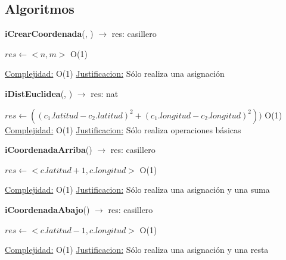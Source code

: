 \subsection{Algoritmos}
\begin{Algoritmos}

\begin{algorithm}[H]{\textbf{iCrearCoordenada}(, ) $\to$ res: casillero}
	\begin{algorithmic}[1]
		\State $res \gets <n, m>$ \Comment O(1)
		
		\medskip
		\Statex \underline{Complejidad:} O(1)
			\Statex \underline{Justificacion:} Sólo realiza una asignación
	\end{algorithmic}
\end{algorithm}

\begin{algorithm}[H]{\textbf{iDistEuclidea}(, ) $\to$ res: nat}
	\begin{algorithmic}[1]
		\State $res \gets ((c_1.latitud - c_2.latitud)^{2} + (c_1.longitud  - c_2.longitud)^{2}))$ \Comment O(1)
				\medskip
		\Statex \underline{Complejidad:} O(1)
			\Statex \underline{Justificacion:} Sólo realiza operaciones básicas
	\end{algorithmic}
\end{algorithm}

\begin{algorithm}[H]{\textbf{iCoordenadaArriba}() $\to$ res: casillero}
	\begin{algorithmic}[1]
		\State $res \gets <c.latitud +1, c.longitud>$ \Comment O(1)
		
		\medskip
		\Statex \underline{Complejidad:} O(1)
			\Statex \underline{Justificacion:} Sólo realiza una asignación y una suma
	\end{algorithmic}
\end{algorithm}

\begin{algorithm}[H]{\textbf{iCoordenadaAbajo}() $\to$ res: casillero}
	\begin{algorithmic}[1]
		\State $res \gets <c.latitud -1, c.longitud>$ \Comment O(1)
		
		\medskip
		\Statex \underline{Complejidad:} O(1)
			\Statex \underline{Justificacion:} Sólo realiza una asignación y una resta
	\end{algorithmic}
\end{algorithm}


\end{Algoritmos}
